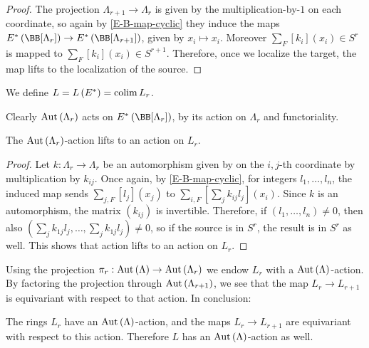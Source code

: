 \begin{proof}
	The projection $\Lambda_{r+1} \to \Lambda_r$ is given by the multiplication-by-$1$ on each coordinate, so again by \ref{E-B-map-cyclic} they induce the maps $E^*\left(\BB[\Lambda_r]\right) \to E^*\left(\BB[\Lambda_{r+1}]\right)$, given by $x_i \mapsto x_i$.
	Moreover $\sum_F [k_i]\left(x_i\right) \in S^r$ is mapped to $\sum_F [k_i]\left(x_i\right) \in S^{r+1}$.
	Therefore, once we localize the target, the map lifts to the localization of the source.
\end{proof}

\begin{definition}
	We define $L = L\left(E^*\right) = \operatorname{colim} L_r$.
\end{definition}

Clearly $\operatorname{Aut}\left(\Lambda_r\right)$ acts on $E^*\left(\BB[\Lambda_r]\right)$, by its action on $\Lambda_r$ and functoriality.

\begin{proposition}
	The $\operatorname{Aut}\left(\Lambda_r\right)$-action lifts to an action on $L_r$.
\end{proposition}

\begin{proof}
	Let $k: \Lambda_r \to \Lambda_r$ be an automorphism given by on the $i,j$-th coordinate by multiplication by $k_{ij}$.
	Once again, by \ref{E-B-map-cyclic}, for integers $l_1, \dotsc, l_n$, the induced map sends $\sum_{j,F} [l_j]\left(x_j\right)$ to $\sum_{i,F}\left[\sum_j k_{ij} l_j\right]\left(x_i\right)$.
	Since $k$ is an automorphism, the matrix $\left(k_{ij}\right)$ is invertible.
	Therefore, if $\left(l_1, \dotsc, l_n\right) \neq 0$, then also $\left(\sum_j k_{1j} l_j, \dotsc, \sum_j k_{1j} l_j\right) \neq 0$, so if the source is in $S^r$, the result is in $S^r$ as well.
	This shows that action lifts to an action on $L_r$.
\end{proof}


Using the projection $\pi_r: \operatorname{Aut}\left(\Lambda\right) \to \operatorname{Aut}\left(\Lambda_r\right)$ we endow $L_r$ with a $\operatorname{Aut}\left(\Lambda\right)$-action.
By factoring the projection through $\operatorname{Aut}\left(\Lambda_{r+1}\right)$, we see that the map $L_r \to L_{r+1}$ is equivariant with respect to that action.
In conclusion:

\begin{proposition}
	The rings $L_r$ have an $\operatorname{Aut}\left(\Lambda\right)$-action, and the maps $L_r \to L_{r+1}$ are equivariant with respect to this action.
	Therefore $L$ has an $\operatorname{Aut}\left(\Lambda\right)$-action as well.
\end{proposition}

